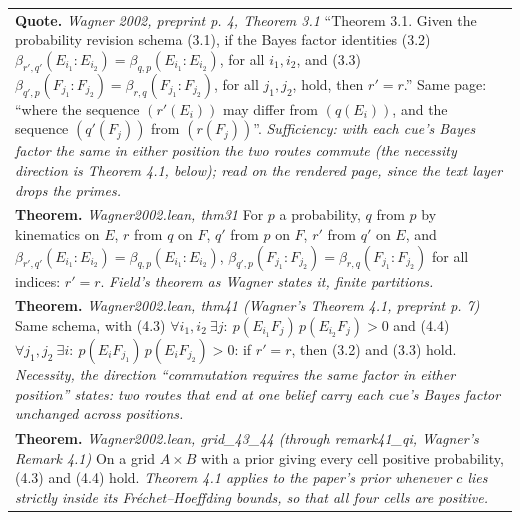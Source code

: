 \documentclass[10pt]{article}
\theoremstyle{definition}
\newlength{\fullw}\setlength{\fullw}{25.9cm}
\begin{document}
{\begin{longtable}{|p{0.9cm}|p{12.2cm}|p{12.2cm}|}
\multicolumn{3}{|p{\fullw}|}{\textbf{Quote.} \textit{Wagner 2002, preprint p. 4, Theorem 3.1} \newline ``Theorem 3.1. Given the probability revision schema (3.1), if the Bayes factor
identities (3.2) $\beta_{r',q'}(E_{i_1}:E_{i_2})=\beta_{q,p}(E_{i_1}:E_{i_2})$, for all
$i_1,i_2$, and (3.3) $\beta_{q',p}(F_{j_1}:F_{j_2})=\beta_{r,q}(F_{j_1}:F_{j_2})$, for
all $j_1,j_2$, hold, then $r'=r$.'' Same page: ``where the sequence $(r'(E_i))$ may
differ from $(q(E_i))$, and the sequence $(q'(F_j))$ from $(r(F_j))$''. \newline \textit{Sufficiency: with each cue's Bayes factor the same in either position the two routes commute (the necessity direction is Theorem 4.1, below); read on the rendered page, since the text layer drops the primes.}} \\
\multicolumn{3}{|p{\fullw}|}{\textbf{Theorem.} \textit{Wagner2002.lean, thm31} \newline For $p$ a probability, $q$ from $p$ by kinematics on $E$, $r$ from $q$ on $F$,
$q'$ from $p$ on $F$, $r'$ from $q'$ on $E$, and
$\beta_{r',q'}(E_{i_1}:E_{i_2})=\beta_{q,p}(E_{i_1}:E_{i_2})$,
$\beta_{q',p}(F_{j_1}:F_{j_2})=\beta_{r,q}(F_{j_1}:F_{j_2})$ for all indices:
$r'=r$. \newline \textit{Field's theorem as Wagner states it, finite partitions.}} \\
\multicolumn{3}{|p{\fullw}|}{\textbf{Theorem.} \textit{Wagner2002.lean, thm41 (Wagner's Theorem 4.1, preprint p. 7)} \newline Same schema, with (4.3) $\forall i_1,i_2\ \exists j:\ p(E_{i_1}F_j)\,p(E_{i_2}F_j)>0$ and
(4.4) $\forall j_1,j_2\ \exists i:\ p(E_iF_{j_1})\,p(E_iF_{j_2})>0$: if $r'=r$, then (3.2) and (3.3)
hold. \newline \textit{Necessity, the direction ``commutation requires the same factor in either position'' states: two routes that end at one belief carry each cue's Bayes factor unchanged across positions.}} \\
\multicolumn{3}{|p{\fullw}|}{\textbf{Theorem.} \textit{Wagner2002.lean, grid\_43\_44 (through remark41\_qi, Wagner's Remark 4.1)} \newline On a grid $A\times B$ with a prior giving every cell positive probability, (4.3) and
(4.4) hold. \newline \textit{Theorem 4.1 applies to the paper's prior whenever $c$ lies strictly inside its Fr\'echet--Hoeffding bounds, so that all four cells are positive.}} \\

\end{longtable}}
\end{document}
